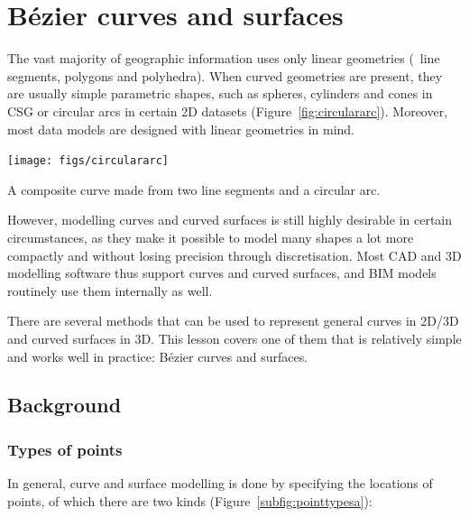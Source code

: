 
\setchapterpreamble[u]{\margintoc}

\graphicspath{{curves/}}

\chapter{B\'ezier curves and surfaces}
\label{chap:curves}

The vast majority of geographic information uses only linear geometries (\ie\ line segments, polygons and polyhedra).
When curved geometries are present, they are usually simple parametric shapes, such as spheres, cylinders and cones in CSG or circular arcs in certain 2D datasets (Figure~\ref{fig:circulararc}).
Moreover, most data models are designed with linear geometries in mind.

\begin{marginfigure}
\centering
\texttt{[image: figs/circulararc]}
\caption{A composite curve made from two line segments and a circular arc.}%
\label{fig:circulararc}
\end{marginfigure}

However, modelling curves and curved surfaces is still highly desirable in certain circumstances, as they make it possible to model many shapes a lot more compactly and without losing precision through discretisation.
Most CAD and 3D modelling software thus support curves and curved surfaces, and BIM models routinely use them internally as well.

There are several methods that can be used to represent general curves in 2D/3D and curved surfaces in 3D.
This lesson covers one of them that is relatively simple and works well in practice: B\'ezier curves and surfaces.

\section{Background}

\subsection{Types of points}

In general, curve and surface modelling is done by specifying the locations of points, of which there are two kinds (Figure~\ref{subfig:pointtypesa}):

